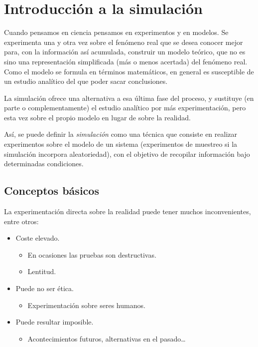 \documentclass[
]{book}
\providecommand{\tightlist}{%
  \setlength{\itemsep}{0pt}\setlength{\parskip}{0pt}}
\theoremstyle{break}
\theoremstyle{definition}
\theoremstyle{definition}
\theoremstyle{definition}
\theoremstyle{definition}
\theoremstyle{remark}
\begin{document}
\hypertarget{cap1}{%
\chapter{Introducción a la simulación}\label{cap1}}

Cuando pensamos en ciencia pensamos en experimentos y en modelos.
Se experimenta una y otra vez sobre el fenómeno real que se desea conocer mejor para, con la información así acumulada, construir un modelo teórico, que no es sino una representación simplificada (más o menos acertada) del fenómeno real.
Como el modelo se formula en términos matemáticos, en general es susceptible de un estudio analítico del que poder sacar conclusiones.

La simulación ofrece una alternativa a esa última fase del proceso, y sustituye (en parte o complementamente) el estudio analítico por más experimentación, pero esta vez sobre el propio modelo en lugar de sobre la realidad.

Así, se puede definir la \emph{simulación} como una técnica que consiste en realizar experimentos sobre el modelo de un sistema (experimentos de muestreo si la simulación incorpora aleatoriedad), con el objetivo de recopilar información bajo determinadas condiciones.

\hypertarget{conceptos-buxe1sicos}{%
\section{Conceptos básicos}\label{conceptos-buxe1sicos}}

La experimentación directa sobre la realidad puede tener muchos inconvenientes, entre otros:

\begin{itemize}
\item
  Coste elevado.

  \begin{itemize}
  \item
    En ocasiones las pruebas son destructivas.
  \item
    Lentitud.
  \end{itemize}
\item
  Puede no ser ética.

  \begin{itemize}
  \tightlist
  \item
    Experimentación sobre seres humanos.
  \end{itemize}
\item
  Puede resultar imposible.

  \begin{itemize}
  \tightlist
  \item
    Acontecimientos futuros, alternativas en el pasado\ldots{}
  \end{itemize}
\end{itemize}
\end{document}
